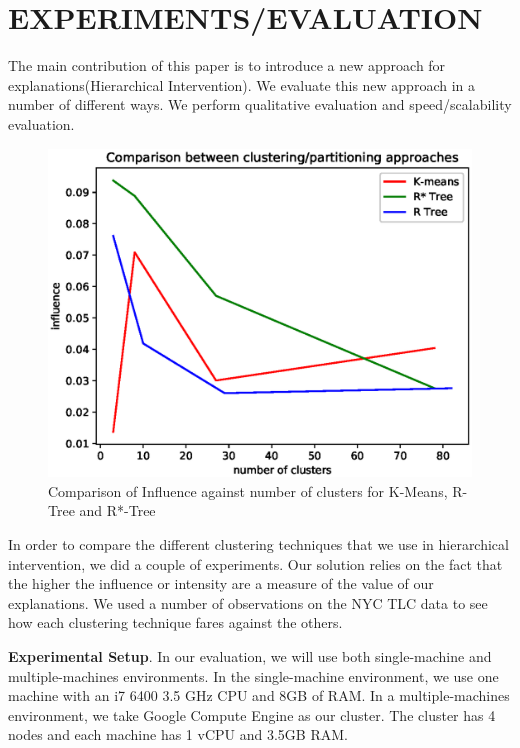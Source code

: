 \section{EXPERIMENTS/EVALUATION}
\label{sec:evaluation}
The main contribution of this paper is to introduce a new approach for explanations(Hierarchical Intervention). We evaluate this new approach in a number of different ways. We perform qualitative evaluation and speed/scalability evaluation.

\begin{figure}[H]
\includegraphics[width=\columnwidth]{images/clustering_comparison}
\caption{Comparison of Influence against number of clusters for K-Means, R-Tree and R*-Tree}
\label{fig:clustering_comparison}
\end{figure}

In order to compare the different clustering techniques that we use in hierarchical intervention, we did a couple of experiments. Our solution relies on the fact that the higher the influence or intensity are a measure of the value of our explanations. We used a number of observations on the NYC TLC data to see how each clustering technique fares against the others.

\textbf{Experimental Setup}. 
In our evaluation, we will use both single-machine and multiple-machines environments. 
In the single-machine environment, we use one machine with an i7 6400 3.5 GHz CPU and 8GB of RAM. 
In a multiple-machines environment, we take Google Compute Engine as our cluster. 
The cluster has 4 nodes and each machine has 1 vCPU and 3.5GB RAM.

